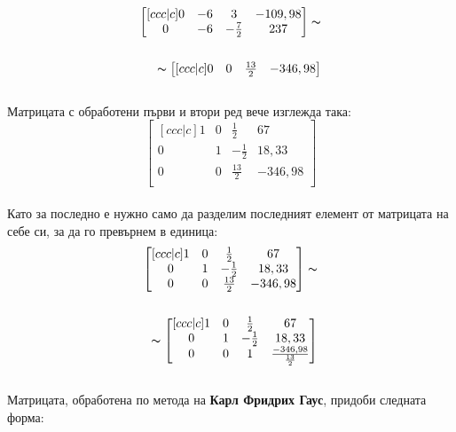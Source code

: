 \documentclass[12pt, a4paper]{article}
\begin{document}
\begin{enumerate}
{\begin{equation}
\begin{split}
\begin{bmatrix}[ccc|c]
							0 & -6 & 3 & -109,98\\
							0 & -6 & -\frac{7}{2} & 237\\
						\end{bmatrix}\thicksim\\\\
						\thicksim
						\begin{bmatrix}[ccc|c]
							0 & 0 & \frac{13}{2} & -346,98\\
						\end{bmatrix}
					\end{split}
				\end{equation}\\
				Матрицата с обработени първи и втори ред вече изглежда така:\\
				\begin{equation}
					\begin{bmatrix}[ccc|c]
						1 & 0 & \frac{1}{2} & 67\\
						0 & 1 & -\frac{1}{2} & 18,33\\
						0 & 0 & \frac{13}{2} & -346,98\\
					\end{bmatrix}
				\end{equation}\\
				Като за последно е нужно само да разделим последният елемент от матрицата на себе си, за да го превърнем в единица:\\
				\begin{equation}
					\begin{split}
						\begin{bmatrix}[ccc|c]
							1 & 0 & \frac{1}{2} & 67\\
							0 & 1 & -\frac{1}{2} & 18,33\\
							0 & 0 & \frac{13}{2} & -346,98\\
						\end{bmatrix}\thicksim\\\\
						\thicksim
						\begin{bmatrix}[ccc|c]
							1 & 0 & \frac{1}{2} & 67\\
							0 & 1 & -\frac{1}{2} & 18,33\\
							0 & 0 & 1 & \frac{-346,98}{\frac{13}{2}}\\
						\end{bmatrix}
					\end{split}
				\end{equation}\\
				Матрицата, обработена по метода на \textbf{Карл Фридрих Гаус}, придоби следната форма:\\
}
\end{enumerate}
\end{document}
